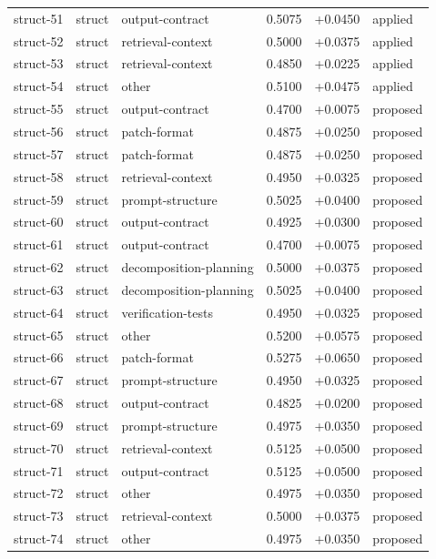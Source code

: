 \begin{center}
\begin{longtable}{llp{5.2cm}rrl}
struct-51 & struct & output-contract & 0.5075 & +0.0450 & applied \\
struct-52 & struct & retrieval-context & 0.5000 & +0.0375 & applied \\
struct-53 & struct & retrieval-context & 0.4850 & +0.0225 & applied \\
struct-54 & struct & other & 0.5100 & +0.0475 & applied \\
struct-55 & struct & output-contract & 0.4700 & +0.0075 & proposed \\
struct-56 & struct & patch-format & 0.4875 & +0.0250 & proposed \\
struct-57 & struct & patch-format & 0.4875 & +0.0250 & proposed \\
struct-58 & struct & retrieval-context & 0.4950 & +0.0325 & proposed \\
struct-59 & struct & prompt-structure & 0.5025 & +0.0400 & proposed \\
struct-60 & struct & output-contract & 0.4925 & +0.0300 & proposed \\
struct-61 & struct & output-contract & 0.4700 & +0.0075 & proposed \\
struct-62 & struct & decomposition-planning & 0.5000 & +0.0375 & proposed \\
struct-63 & struct & decomposition-planning & 0.5025 & +0.0400 & proposed \\
struct-64 & struct & verification-tests & 0.4950 & +0.0325 & proposed \\
struct-65 & struct & other & 0.5200 & +0.0575 & proposed \\
struct-66 & struct & patch-format & 0.5275 & +0.0650 & proposed \\
struct-67 & struct & prompt-structure & 0.4950 & +0.0325 & proposed \\
struct-68 & struct & output-contract & 0.4825 & +0.0200 & proposed \\
struct-69 & struct & prompt-structure & 0.4975 & +0.0350 & proposed \\
struct-70 & struct & retrieval-context & 0.5125 & +0.0500 & proposed \\
struct-71 & struct & output-contract & 0.5125 & +0.0500 & proposed \\
struct-72 & struct & other & 0.4975 & +0.0350 & proposed \\
struct-73 & struct & retrieval-context & 0.5000 & +0.0375 & proposed \\
struct-74 & struct & other & 0.4975 & +0.0350 & proposed \\

\end{longtable}
\end{center}

